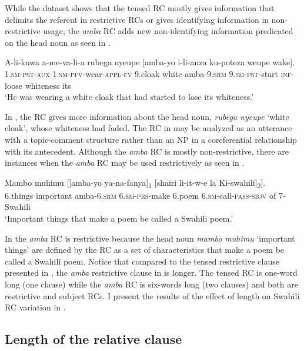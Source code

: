 \documentclass[output=paper,colorlinks,citecolor=brown]{langscibook}
\begin{document}
While the dataset shows that the tensed RC mostly gives information that delimits the referent in restrictive RCs or gives identifying information in non-restrictive usage, the \textit{amba} RC adds new non-identifying information predicated on the head noun as seen in .

\ea%
    \label{ex:mwamzandi:17}
    \gll    A-li-kuwa a-me-va-li-a rubega nyeupe [amba-yo i-li-anza ku-poteza weupe wake].\\
            \textsc{1.sm-pst-aux} \textsc{1.sm-pfv-}wear\textsc{-appl-fv} 9.cloak white amba\textsc{-9.srm} \textsc{9.sm-pst-}start \textsc{inf-}loose whiteness its\\
    \glt    ‘He was wearing a white cloak that had started to lose its whiteness.’
\z

In , the RC gives more information about the head noun, \textit{rubega nyeupe} ‘white cloak’, whose whiteness had faded. The RC in  may be analyzed as an utterance with a topic-comment structure rather than an NP in a coreferential relationship with its antecedent. Although the \textit{amba} RC is mostly non-restrictive, there are instances when the \textit{amba} RC may be used restrictively as seen in .

\ea%
    \label{ex:mwamzandi:18}
    \gll    Mambo muhimu [[amba-yo  ya-na-fanya]\textsubscript{1} [shairi li-it-w-e la Ki-swahili]\textsubscript{2}].\\
            6.things important amba\textsc{-6.srm} \textsc{6.sm-prs-}make 6.poem  \textsc{6.sm-}call\textsc{-pass-sbjv} of 7-Swahili\\
    \glt    ‘Important things that make a poem be called a Swahili poem.’
\z

In  the \textit{amba} RC is restrictive because the head noun \textit{mambo muhimu} ‘important things’ are defined by the RC as a set of characteristics that make a poem be called a Swahili poem. Notice that compared to the tensed restrictive clause presented in , the \textit{amba} restrictive clause in  is longer. The tensed RC is one-word long (one clause) while the \textit{amba} RC is six-words long (two clauses) and both are restrictive and subject RCs. I present the results of the effect of length on Swahili RC variation in .

\subsection{Length of the relative clause}\label{sec:mwamzandi:4.2}
\end{document}
